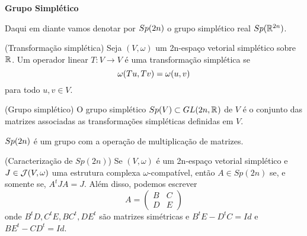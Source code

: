 \documentclass{beamer}
\newcommand{\titulo}[1]{\centering \textbf{#1}}
\begin{document}
\begin{frame}
	\titulo{Grupo Simplético}
	
	Daqui em diante vamos denotar por $Sp(2n)$ o grupo simplético real $Sp(\mathbb{R}^{2n})$.
	
	\begin{definicao}
		(Transformação simplética) Seja $(V, \omega)$ um 2n-espaço vetorial simplético sobre $\mathbb{R}^{}$. Um operador linear $T: V \to V$ é uma transformação simplética se 
		$$
		\omega(Tu, Tv) = \omega(u, v)
		$$ para todo $u,v\in V$.
	\end{definicao}
	
	\begin{definicao}
		(Grupo simplético) O grupo simplético $Sp(V) \subset GL(2n, \mathbb{R}^{})$ de $V$ é o conjunto das matrizes associadas as transformações simpléticas definidas em $V$.
	\end{definicao}	
\end{frame}

\begin{frame}
	\begin{proposicao}
		$Sp(2n)$ é um grupo com a operação de multiplicação de matrizes.
	\end{proposicao}
	
	\begin{lema}\label{lema_caracterizacao_Sp2n}
		(Caracterização de $Sp(2n)$) Se $(V, \omega)$ é um 2n-espaço vetorial simplético e $J \in \mathcal{J}(V, \omega)$ uma estrutura complexa $\omega$-compatível, então $A\in Sp(2n)$ se, e somente se, $A^{t}JA = J$. Além disso, podemos escrever 
		$$
		A=
		\left(
		\begin{array}{cc}
		B & C
		\\
		D & E
		\end{array}
		\right)
		$$
		onde $B^{t}D, C^{t}E, BC^{t}, DE^{t} $ são matrizes simétricas e $B^{t}E - D^{t}C = Id$ e $BE^{t} - CD^{t} = Id$.
	\end{lema}
\end{frame}
\end{document}
